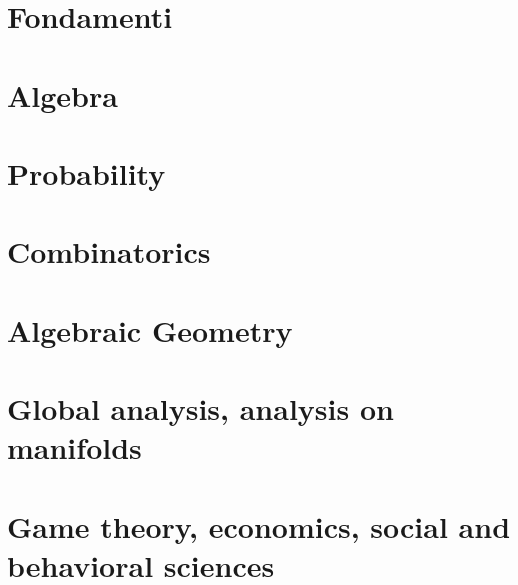 \documentclass[a4paper,10pt]{book}
\begin{document}
  \tableofcontents
	
  
  
  
  \part{Fondamenti}
  
  \part{Algebra}
  

  \part{Probability}
  
  
  \part{Combinatorics}
  
  
  \part{Algebraic Geometry}
  
  
  \part{Global analysis, analysis on manifolds}  
  
  
  \part{Game theory, economics, social and behavioral sciences}
  
  
 
  \cleardoublepage

  
\end{document}
